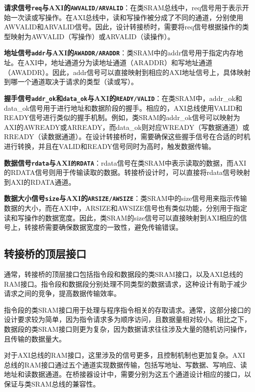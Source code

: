 \textbf{请求信号\texttt{req}与AXI的\texttt{AWVALID/ARVALID}}：在类SRAM总线中，req信号用于表示开始一次读或写操作。在AXI总线中，读和写操作被分成了不同的通道，分别使用AWVALID和ARVALID信号。因此，设计转接桥时，需要将req信号根据操作的类型映射为AWVALID（写操作）或ARVALID（读操作）。

\textbf{地址信号\texttt{addr}与AXI的\texttt{AWADDR/ARADDR}}：类SRAM中的addr信号用于指定内存地址。在AXI中，地址通道分为读地址通道（ARADDR）和写地址通道（AWADDR）。因此，addr信号可以直接映射到相应的AXI地址信号上，具体映射到哪一个通道取决于请求的类型（读或写）。

\textbf{握手信号\texttt{addr\_ok}和\texttt{data\_ok}与AXI的\texttt{READY/VALID}}：在类SRAM中，addr\_ok和data\_ok信号用于进行地址和数据阶段的握手。相应的，AXI总线使用VALID和READY信号进行类似的握手机制。例如，类SRAM的addr\_ok信号可以映射为AXI的AWREADY或ARREADY，而data\_ok则对应WREADY（写数据通道）或RREADY（读数据通道）。在设计转接桥时，需要确保这些握手信号在合适的时机进行转换，并且在VALID和READY信号同时为高时，触发数据传输。

\textbf{数据信号\texttt{rdata}与AXI\texttt{的RDATA}}：rdata信号在类SRAM中表示读取的数据，而AXI的RDATA信号则用于传输读取的数据。转接桥设计时，可以直接将rdata信号映射到AXI的RDATA通道。

\textbf{数据大小信号\texttt{size}与AXI的\texttt{ARSIZE/AWSIZE}}：类SRAM中的size信号用来指示传输数据的大小，而在AXI中，ARSIZE和AWSIZE信号也有类似功能，分别用于指定读和写操作的数据宽度。因此，类SRAM的size信号可以直接映射到AXI相应的信号上，转接桥需要确保数据宽度的一致性，避免传输错误。

\subsection{转接桥的顶层接口}\label{sec:08-bus-and-soc-027}

通常，转接桥的顶层接口包括指令段和数据段的类SRAM接口，以及AXI总线的RAM接口。指令段和数据段分别处理不同类型的数据请求，这种设计有助于减少请求之间的竞争，提高数据传输效率。

指令段的类SRAM接口用于处理与程序指令相关的存取请求。通常，这部分接口的设计要求较为简单，因为指令请求多为顺序访问，且数据量相对较小。相比之下，数据段的类SRAM接口则更为复杂，因为数据请求往往涉及大量的随机访问操作，且传输的数据量大。

对于AXI总线的RAM接口，这里涉及的信号更多，且控制机制也更加复杂。AXI总线的RAM接口通过五个通道实现数据传输，包括写地址、写数据、写响应、读地址和读数据通道。在桥接器设计中，需要分别为这五个通道设计相应的接口，以保证与类SRAM总线的兼容性。

